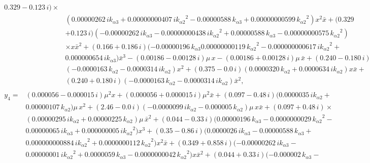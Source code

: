 \documentclass[openacc]{rsproca_new}%
\begin{document}
\begin{appendices}
\begin{align}
\begin{split}
  0.329- 0.123\,i ) \times \\&(  0.00000262\,i{  k_{\alpha 3}}+
  0.00000000407\,i{{  k_{\alpha 2}}}^{2}-0.00000588\,{  k_{\alpha 3}}+ 0.00000000599
  \,{{  k_{\alpha 2}}}^{2} ) {x}^{2}\bar x+ (  0.329\\&+ 0.123\,i )
  ( - 0.00000262\,i{  k_{\alpha 3}}- 0.00000000438\,i{{  k_{\alpha 2}}}^{2}+0.00000588\,{  k_{\alpha 3}}- 0.00000000575\,{{  k_{\alpha 2}}}^{2} ) \\& \times x{\bar x}^{2
  }+ (  0.166+ 0.186\,i )  ( - 0.00000196\,{  k_{\alpha 3}}
  0.00000000119\,{{  k_{\alpha 2}}}^{2}-0.000000000617\,i{{  k_{\alpha 2}}}^{2}+ \\&
  0.000000654\,i{  k_{\alpha 3}} ) {\bar x}^{3}- (  0.00186- 0.00128\,i
  ) \mu\,x-(  0.00186+ 0.00128\,i ) \mu\,\bar x+ (
  0.240- 0.180\,i ) \times  \\&( - 0.0000163\,{  k_{\alpha 2}}- 0.0000314\,i{
    k_{\alpha 2}} ) {x}^{2}+ (  0.375- 0.0\,i )(
  0.0000320\,{  k_{\alpha 2}}+ 0.0000634\,i{  k_{\alpha 2}} ) x\bar x+\\&(  0.240
  + 0.180\,i )  ( - 0.0000163\,{  k_{\alpha 2}}- 0.0000314\,i{
  k_{\alpha 2}} ) {\bar x}^{2},
  \end{split}
  \end{align}
  \begin{align}
  \begin{split}
  y_4=&(  0.000056- 0.000015\,i ) {\mu}^{2}x+ (  0.000056
  + 0.000015\,i ) {\mu}^{2}\bar x+ (  0.097- 0.48\,i )
  (  0.0000035\,i{  k_{\alpha 2}}+ \\&0.00000107\,{  k_{\alpha 2}} ) \mu\,{x
  }^{2}+ (  2.46- 0.0\,i )  ( - 0.0000099\,i{  k_{\alpha 2}}-
  0.000005\,{  k_{\alpha 2}} ) \mu\,x\bar x+ (  0.097+ 0.48\,i
  ) \times \\&(  0.00000295\,i{  k_{\alpha 2}}+ 0.00000225\,{  k_{\alpha 2}}
  ) \mu\,{\bar x}^{2}+ (  0.044- 0.33\,i )  (
  0.00000196\,{  k_{\alpha 3}}- 0.0000000029\,{{  k_{\alpha 2}}}^{2}- \\&0.00000065\,i
  {  k_{\alpha 3}}+ 0.000000005\,i{{  k_{\alpha 2}}}^{2} ) {x}^{3}+ (
  0.35- 0.86\,i )  (  0.0000026\,i{  k_{\alpha 3}}- 0.00000588\,
  {  k_{\alpha 3}}+ \\&0.000000000884\,i{{  k_{\alpha 2}}}^{2}+ 0.0000000112\,{{  k_{\alpha 2}}}
  ^{2} ) {x}^{2}\bar x+ (  0.349+ 0.858\,i )  ( -
  0.00000262\,i{  k_{\alpha 3}}- \\&0.00000001\,i{{  k_{\alpha 2}}}^{2}+ 0.0000059\,{
    k_{\alpha 3}}- 0.0000000042\,{{  k_{\alpha 2}}}^{2} ) x{\bar x}^{2}+ (
  0.044+ 0.33\,i )  ( - 0.000002\,{  k_{\alpha 3}}-\\&

\end{split}
\end{align}
\end{appendices}
\end{document}
